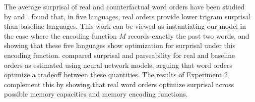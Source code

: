 The average surprisal of real and counterfactual word orders have been studied by \citet{gildea-human-2015} and \cite{hahn2020universals}.
\citet{gildea-human-2015} found that, in five languages, real orders provide lower trigram surprisal than baseline languages.
This work can be viewed as instantiating our model in the case where the encoding function $M$ records exactly the past two words, and showing that these five languages show optimization for surprisal under this encoding function.
\citet{hahn2020universals} compared surprisal and parseability for real and baseline orders as estimated using neural network models, arguing that word orders optimize a tradeoff between these quantities.
The results of Experiment 2 complement this by showing that real word orders optimize surprisal across possible memory capacities and memory encoding functions.









